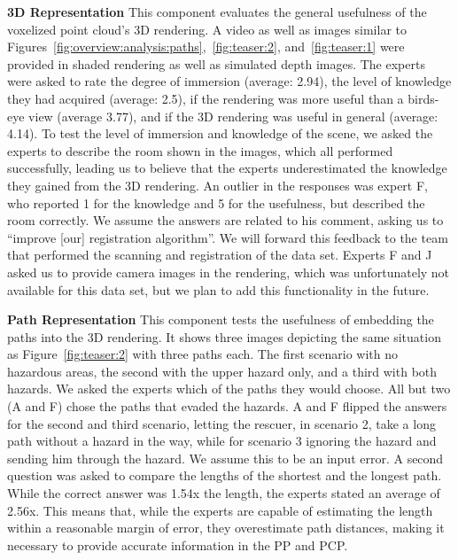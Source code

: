 \documentclass[conference,10pt,letter]{IEEEtran}
\begin{document}
\noindent \textbf{3D Representation} This component evaluates the general usefulness of the voxelized point cloud's 3D rendering. A video as well as images similar to Figures~\ref{fig:overview:analysis:paths},~\ref{fig:teaser:2}, and~\ref{fig:teaser:1} were provided in shaded rendering as well as simulated depth images. The experts were asked to rate the degree of immersion (average: 2.94), the level of knowledge they had acquired (average: 2.5), if the rendering was more useful than a birds-eye view (average 3.77), and if the 3D rendering was useful in general (average: 4.14). To test the level of immersion and knowledge of the scene, we asked the experts to describe the room shown in the images, which all performed successfully, leading us to believe that the experts underestimated the knowledge they gained from the 3D rendering. An outlier in the responses was expert F, who reported 1 for the knowledge and 5 for the usefulness, but described the room correctly. We assume the answers are related to his comment, asking us to ``improve [our] registration algorithm''. We will forward this feedback to the team that performed the scanning and registration of the data set. Experts F and J asked us to provide camera images in the rendering, which was unfortunately not available for this data set, but we plan to add this functionality in the future.

\noindent \textbf{Path Representation} This component tests the usefulness of embedding the paths into the 3D rendering. It shows three images depicting the same situation as Figure~\ref{fig:teaser:2} with three paths each. The first scenario with no hazardous areas, the second with the upper hazard only, and a third with both hazards. We asked the experts which of the paths they would choose. All but two (A and F) chose the paths that evaded the hazards. A and F flipped the answers for the second and third scenario, letting the rescuer, in scenario 2, take a long path without a hazard in the way, while for scenario 3 ignoring the hazard and sending him through the hazard. We assume this to be an input error. A second question was asked to compare the lengths of the shortest and the longest path. While the correct answer was 1.54x the length, the experts stated an average of 2.56x. This means that, while the experts are capable of estimating the length within a reasonable margin of error, they overestimate path distances, making it necessary to provide accurate information in the PP and PCP.
\end{document}
